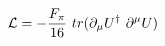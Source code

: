 \begin{equation}
{\cal{L}}= -\frac{F_\pi}{16}~tr(\partial_\mu U^\dag~\partial^\mu U)  \label{eq:v12}
\end{equation}

